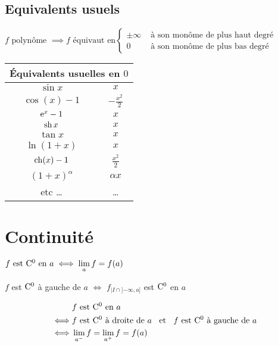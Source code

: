 \subsection{Equivalents usuels}
$
f \text{ polynôme } \implies
f \text{ équivaut en}
\begin{cases}
\pm \infty  &\text{ à son monôme de plus haut degré} \\
0           &\text{ à son monôme de plus bas degré}
\end{cases}
$

\begin{tabular}{|c|c|}
\hline
\multicolumn{2}{|c|}{\'Equivalents usuelles en $0$} \\
\hline
$\sin x$ & $x$ \\
\hline
$\cos(x) - 1$ & $-\frac{x^2}{2}$ \\
\hline
$\ex^x - 1$ & $x$ \\
\hline
$\sh x $ & $x$ \\
\hline
$\tan x $ & $x$ \\
\hline
$\ln(1 + x)$ & $x$ \\
\hline
$\ch(x) - 1$ & $\frac{x^2}{2}$ \\
\hline
$(1 + x)^\alpha$ & $\alpha x$ \\
\hline
etc \ldots & \ldots \\
\hline
\end{tabular}

\section{Continuité}

\begin{dfn}
$f \text{ est } \co{0} \text{ en } a \iff \lm_a f = f(a)$
\end{dfn}

\begin{dfn}
$f$ est $\co{0}$ à gauche de $a$ $\iff$ $f_{|I\cap{]{-\infty},a]}}$ est
$\co{0}$ en $a$
\end{dfn}

\begin{prp}
\begin{align*}
    & f \est \co{0} \en a \\
\iff& f \est \co{0} \drt a \et f \est \co{0} \gch a \\
\iff& \lm_{a^-} f = \lm_{a^+} f = f(a) \\
\end{align*}
\end{prp}

